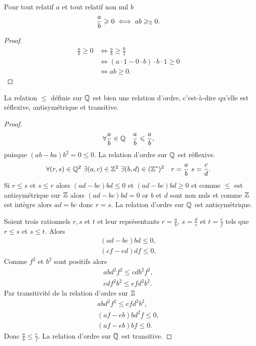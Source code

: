 \begin{prop}
  Pour tout relatif \(a\) et tout relatif non nul \(b\)
  \begin{equation}
    \frac{a}{b} \geqslant 0 \iff ab \geqslant_{\mathbb{Z}} 0.
  \end{equation}
\end{prop}
\begin{proof}
  \begin{align}
    \frac{a}{b} \geqslant 0 &\iff \frac{a}{b} \geqslant \frac{0}{1} \\
    & \iff (a \cdot 1 - 0 \cdot b)\cdot b \cdot 1 \geqslant 0 \\
    & \iff ab \geqslant 0.
  \end{align}
\end{proof}
\begin{prop}
  La relation \(\leqslant\) définie sur \(\mathbb{Q}\) est bien une relation d'ordre, c'est-à-dire qu'elle est réflexive, antisymétrique et transitive.
\end{prop}
\begin{proof}
  \begin{equation}
    \forall \frac{a}{b} \in \mathbb{Q} \quad \frac{a}{b} \leqslant \frac{a}{b},
  \end{equation}
  puisque \((ab-ba)b^2=0 \leqslant 0\). La relation d'ordre sur \(\mathbb{Q}\) est réflexive.
  \begin{equation}
    \forall (r,s) \in \Q^2 \ \exists (a,c) \in \Z^2 \ \exists (b,d) \in (\Z^*)^2 \quad r=\frac{a}{b} \ s=\frac{c}{d}.
  \end{equation}
  Si \(r\leqslant s\) et \(s \leqslant r\) alors \((ad-bc)bd \leqslant 0\) et \((ad-bc)bd \geqslant 0\) et comme \(\leqslant\) est antisymétrique sur \(\mathbb{Z}\) alors \((ad-bc)bd=0\) or \(b\) et \(d\) sont non nuls et comme \(\mathbb{Z}\) est intègre alors \(ad=bc\) donc \(r=s\). La relation d'ordre sur \(\mathbb{Q}\) est antisymétrique.

Soient trois rationnels \(r,s\) et \(t\) et leur représentants \(r=\frac{a}{b}\), \(s=\frac{d}{c}\) et \(t=\frac{e}{f}\) tels que \(r \leqslant s\) et \(s \leqslant t\). Alors
\begin{align}
  (ad-bc)bd \leqslant 0, \\
  (cf-ed)df \leqslant 0.
\end{align}
Comme \(f^2\) et \(b^2\) sont positifs alors
\begin{align}
  abd^2f^2 \leqslant cdb^2f^2, \\
  cdf^2b^2 \leqslant efd^2b^2.
\end{align}
Par transitivité de la relation d'ordre sur \(\mathbb{Z}\)
\begin{align}
  abd^2f^2 \leqslant efd^2b^2, \\
  (af-eb)bd^2f \leqslant 0, \\
  (af-eb)bf \leqslant 0.
\end{align}
Donc \(\frac{a}{b} \leqslant \frac{e}{f}\). La relation d'ordre sur \(\mathbb{Q}\) est transitive.
\end{proof}
